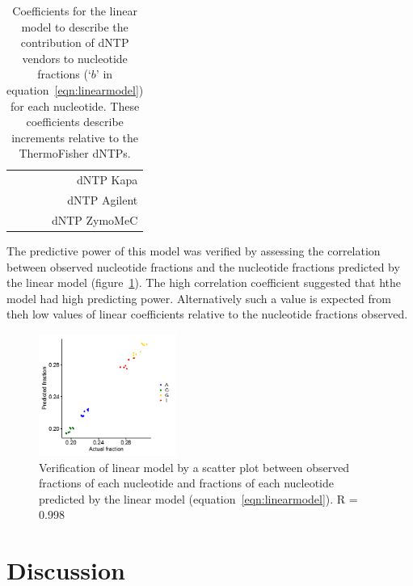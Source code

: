 \documentclass[parskip=full, numbers=noenddot]{scrbook}
\begin{document}
\begin{table}[h]
  \centering
  \begin{tabular}{r}
     \\
    dNTP Kapa\\
    dNTP Agilent\\
    dNTP ZymoMeC\\
  \end{tabular}%
  \caption{Coefficients for the linear model to describe the contribution of dNTP vendors to nucleotide fractions (`$b$' in equation~\ref{eqn:linearmodel}) for each nucleotide.  These coefficients describe increments relative to the ThermoFisher dNTPs.}
  \label{tab:linearmodel_coeffs_b}
\end{table}

The predictive power of this model was verified by assessing the correlation between observed nucleotide fractions and the nucleotide fractions predicted by the linear model (figure~\ref{fig:linearmodel_ver}).  The high correlation coefficient suggested that hthe model had high predicting power.  Alternatively such a value is expected from theh low values of linear coefficients relative to the nucleotide fractions observed.

\begin{figure}[htbp]
  \centering
  \includegraphics[width=0.4\textwidth]{linearmodel_plot}
  \caption{Verification of linear model by a scatter plot between observed fractions of each nucleotide and fractions of each nucleotide predicted by the linear model (equation~\ref{eqn:linearmodel}).  R = 0.998}
  \label{fig:linearmodel_ver}
\end{figure}

\section{Discussion}
\label{sec:pcrbias_discussion}
\end{document}
